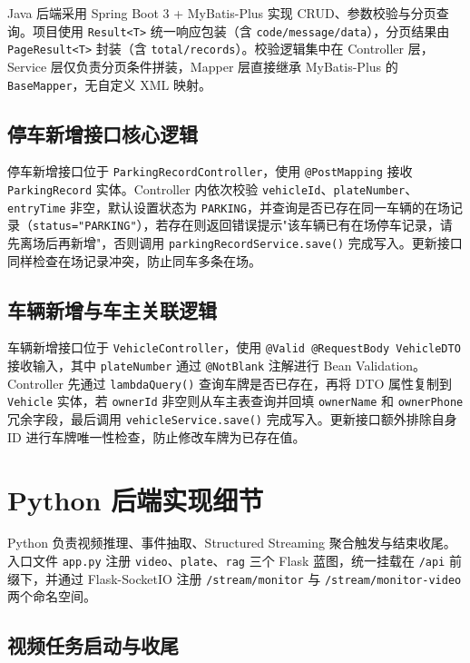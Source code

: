 \documentclass{wzuthesis} %
\begin{document}
Java 后端采用 Spring Boot 3 + MyBatis-Plus 实现 CRUD、参数校验与分页查询。项目使用 \texttt{Result<T>} 统一响应包装（含 \texttt{code/message/data}），分页结果由 \texttt{PageResult<T>} 封装（含 \texttt{total/records}）。校验逻辑集中在 Controller 层，Service 层仅负责分页条件拼装，Mapper 层直接继承 MyBatis-Plus 的 \texttt{BaseMapper}，无自定义 XML 映射。

\subsection{停车新增接口核心逻辑}

停车新增接口位于 \texttt{ParkingRecordController}，使用 \texttt{@PostMapping} 接收 \texttt{ParkingRecord} 实体。Controller 内依次校验 \texttt{vehicleId}、\texttt{plateNumber}、\texttt{entryTime} 非空，默认设置状态为 \texttt{PARKING}，并查询是否已存在同一车辆的在场记录（\texttt{status="PARKING"}），若存在则返回错误提示"该车辆已有在场停车记录，请先离场后再新增"，否则调用 \texttt{parkingRecordService.save()} 完成写入。更新接口同样检查在场记录冲突，防止同车多条在场。

\subsection{车辆新增与车主关联逻辑}

车辆新增接口位于 \texttt{VehicleController}，使用 \texttt{@Valid @RequestBody VehicleDTO} 接收输入，其中 \texttt{plateNumber} 通过 \texttt{@NotBlank} 注解进行 Bean Validation。Controller 先通过 \texttt{lambdaQuery()} 查询车牌是否已存在，再将 DTO 属性复制到 \texttt{Vehicle} 实体，若 \texttt{ownerId} 非空则从车主表查询并回填 \texttt{ownerName} 和 \texttt{ownerPhone} 冗余字段，最后调用 \texttt{vehicleService.save()} 完成写入。更新接口额外排除自身 ID 进行车牌唯一性检查，防止修改车牌为已存在值。

\section{Python 后端实现细节}

Python 负责视频推理、事件抽取、Structured Streaming 聚合触发与结束收尾。入口文件 \texttt{app.py} 注册 \texttt{video}、\texttt{plate}、\texttt{rag} 三个 Flask 蓝图，统一挂载在 \texttt{/api} 前缀下，并通过 Flask-SocketIO 注册 \texttt{/stream/monitor} 与 \texttt{/stream/monitor-video} 两个命名空间。

\subsection{视频任务启动与收尾}
\end{document}
